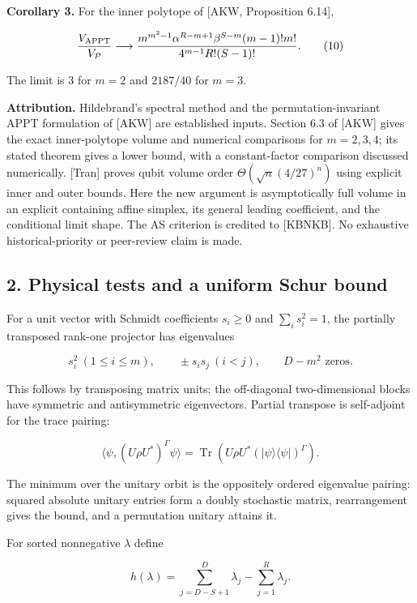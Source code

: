 \documentclass[
  11pt,
]{article}
\begin{document}
\textbf{Corollary 3.} For the inner polytope of {[}AKW, Proposition
6.14{]},

\[
\frac{V_{\rm APPT}}{V_{\mathcal P}}\longrightarrow
\frac{m^{m^2-1}\alpha^{R-m+1}\beta^{S-m}(m-1)!m!}
{4^{m-1}R!(S-1)!}.
\tag{10}
\]

The limit is 3 for \(m=2\) and \(2187/40\) for \(m=3\).

\textbf{Attribution.} Hildebrand's spectral method and the
permutation-invariant APPT formulation of {[}AKW{]} are established
inputs. Section 6.3 of {[}AKW{]} gives the exact inner-polytope volume
and numerical comparisons for \(m=2,3,4\); its stated theorem gives a
lower bound, with a constant-factor comparison discussed numerically.
{[}Tran{]} proves qubit volume order \(\Theta(\sqrt n(4/27)^n)\) using
explicit inner and outer bounds. Here the new argument is asymptotically
full volume in an explicit containing affine simplex, its general
leading coefficient, and the conditional limit shape. The AS criterion
is credited to {[}KBNKB{]}. No exhaustive historical-priority or
peer-review claim is made.

\hypertarget{physical-tests-and-a-uniform-schur-bound}{%
\subsection{2. Physical tests and a uniform Schur
bound}\label{physical-tests-and-a-uniform-schur-bound}}

For a unit vector with Schmidt coefficients \(s_i\geq0\) and
\(\sum_i s_i^2=1\), the partially transposed rank-one projector has
eigenvalues

\[
s_i^2\ (1\leq i\leq m),\qquad\pm s_i s_j\ (i<j),\qquad D-m^2\text{ zeros}.
\tag{11}
\]

This follows by transposing matrix units; the off-diagonal
two-dimensional blocks have symmetric and antisymmetric eigenvectors.
Partial transpose is self-adjoint for the trace pairing:

\[
\langle\psi,(U\rho U^*)^\Gamma\psi\rangle
=\operatorname{Tr}(U\rho U^*(|\psi\rangle\langle\psi|)^\Gamma).
\tag{12}
\]

The minimum over the unitary orbit is the oppositely ordered eigenvalue
pairing: squared absolute unitary entries form a doubly stochastic
matrix, rearrangement gives the bound, and a permutation unitary attains
it.

For sorted nonnegative \(\lambda\) define

\[
h(\lambda)=\sum_{j=D-S+1}^D\lambda_j-\sum_{j=1}^R\lambda_j.
\tag{13}
\]
\end{document}

